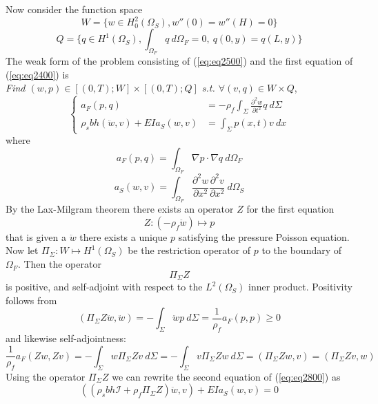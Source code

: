 \documentclass{article}
\begin{document}
Now consider the function space
\begin{equation} W=\{ w \in H_0^2(\Omega_S), w''(0)=w''(H)=0 \} \label{eq:2600} \end{equation}
\begin{equation} Q=\{q \in H^1(\Omega_S), \int_{\Omega_F} q \ d \Omega_F = 0, \ q(0,y) = q(L,y) \} \label{eq:2700} \end{equation}
The weak form of the problem consisting of (\ref{eq:eq2500}) and the first equation of (\ref{eq:eq2400}) is \\
{\it Find $(w,p) \in [(0,T); W]\times [(0,T); Q]$ s.t. $\forall (v,q) \in W \times Q$},
\begin{equation} \left\{ \begin{array}{ll}
a_F(p,q) &= -\rho_f\int_\Sigma \frac{\partial ^2 w}{\partial t^2}q \ d\Sigma \\
\rho_s b h(\ddot{w},v) + EIa_S(w,v) &= \int_{\Sigma }p(x,t)v \ dx
\end{array} \right. \label{eq:eq2800} \end{equation}
where
\begin{equation} a_F(p,q) = \int_{\Omega_F} \nabla p \cdot \nabla q \ d\Omega_F \label{eq:eq2900} \end{equation}
\begin{equation} a_S(w,v) = \int_{\Omega_F} \frac{\partial^2 w}{\partial x^2} \frac{\partial^2 v}{\partial x^2}\ d\Omega_S  \label{eq:eq3000} \end{equation}
By the Lax-Milgram theorem there exists an operator $Z$ for the first equation
\[ Z : (-\rho_f \ddot{w}) \mapsto p \] 
that is given a $\ddot w$ there exists a unique $p$ satisfying the pressure Poisson equation.
Now let $\Pi_{\Sigma} : W \mapsto H^1(\Omega_S)$ be the restriction operator of $p$ to the boundary of $\Omega_F$. 
Then the operator 
\[ \Pi_{\Sigma} Z \]
is positive, and self-adjoint with respect to the $L^2(\Omega_S)$ inner product. 
Positivity follows from 
\[ (\Pi_{\Sigma} Z \ddot{w}, \ddot{w}) = -\int_{\Sigma} \ddot{w} p \ d\Sigma = \frac{1}{\rho_f}a_F(p,p) \geq 0 \]
and likewise self-adjointness:
\[  \frac{1}{\rho_f}a_F(Zw, Zv) = -\int_{\Sigma} w \Pi_{\Sigma} Z v \ d\Sigma = -\int_{\Sigma} v \Pi_{\Sigma} Z w \ d\Sigma = (\Pi_{\Sigma} Z w, v) =  (\Pi_{\Sigma} Z v, w) \] 
Using the operator $\Pi_{\Sigma} Z$ we can rewrite the second equation of (\ref{eq:eq2800}) as 
\begin{equation} ((\rho_sbh\mathcal{I}+\rho_f \Pi_{\Sigma}Z)\ddot{w}, v) + EI a_S(w,v) = 0 \label{eq:eq3100} \end{equation}
\end{document}
